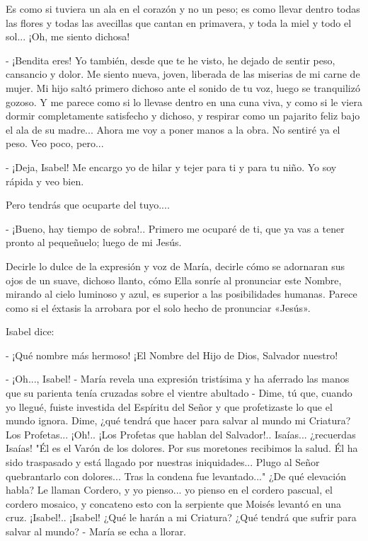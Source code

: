 \documentclass[12pt, twoside, openright]{book} %
\begin{document}
Es como si tuviera un ala en el corazón y no un peso; es como llevar dentro todas las flores y todas las avecillas que cantan en primavera, y toda la miel y todo el sol... ¡Oh, me siento dichosa! 

- ¡Bendita eres! Yo también, desde que te he visto, he dejado de sentir peso, cansancio y dolor. Me siento nueva, joven, liberada de las miserias de mi carne de mujer. Mi hijo saltó primero dichoso ante el sonido de tu voz, luego se tranquilizó gozoso. Y me parece como si lo llevase dentro en una cuna viva, y como si le viera dormir completamente satisfecho y dichoso, y respirar como un pajarito feliz bajo el ala de su madre... Ahora me voy a poner manos a la obra. No sentiré ya el peso. Veo poco, pero... 

- ¡Deja, Isabel! Me encargo yo de hilar y tejer para ti y para tu niño. Yo soy rápida y veo bien. 

Pero tendrás que ocuparte del tuyo.... 

- ¡Bueno, hay tiempo de sobra!.. Primero me ocuparé de ti, que ya vas a tener pronto al pequeñuelo; luego de mi Jesús. 

Decirle lo dulce de la expresión y voz de María, decirle cómo se adornaran sus ojos de un suave, dichoso llanto, cómo Ella sonríe al pronunciar este Nombre, mirando al cielo luminoso y azul, es superior a las posibilidades humanas. Parece como si el éxtasis la arrobara por el solo hecho de pronunciar «Jesús». 

Isabel dice: 

- ¡Qué nombre más hermoso! ¡El Nombre del Hijo de Dios, Salvador nuestro! 

- ¡Oh..., Isabel! - María revela una expresión tristísima y ha aferrado las manos que su parienta tenía cruzadas sobre el vientre abultado - Dime, tú que, cuando yo llegué, fuiste investida del Espíritu del Señor y que profetizaste lo que el mundo ignora. Dime, ¿qué tendrá que hacer para salvar al mundo mi Criatura? Los Profetas... ¡Oh!.. ¡Los Profetas que hablan del Salvador!.. Isaías... ¿recuerdas Isaías! "Él es el Varón de los dolores. Por sus moretones recibimos la salud. Él ha sido traspasado y está llagado por nuestras iniquidades... Plugo al Señor quebrantarlo con dolores... Tras la condena fue levantado..." ¿De qué elevación habla? Le llaman Cordero, y yo pienso... yo pienso en el cordero pascual, el cordero mosaico, y concateno esto con la serpiente que Moisés levantó en una cruz. ¡Isabel!.. ¡Isabel! ¿Qué le harán a mi Criatura? ¿Qué tendrá que sufrir para salvar al mundo? - María se echa a llorar. 
\end{document}
